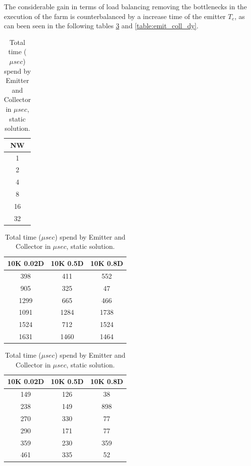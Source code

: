 The considerable gain in terms of load balancing removing the bottlenecks in the execution of the farm is counterbalanced by a increase time of the emitter $T_e$, as can been seen in the following tables \ref{table:emit_coll} and \ref{table:emit_coll_dy}.

\begin{table}[!htb]
\centering
\begin{minipage}{0.08\textwidth}
\centering
\begin{tabular}{|c|}
\hline
NW \\ \hline
1          \\ \hline
2      \\ \hline
4           \\ \hline
8            \\ \hline
16       \\ \hline
32          \\ \hline
\end{tabular}
\end{minipage}
\begin{minipage}{0.43\textwidth}
\centering
\begin{tabular}{|c|c|c|}
\hline
 10K 0.02D & 10K 0.5D & 10K 0.8D \\ \hline
 398       & 411      & 552      \\ \hline
905       & 325      & 47       \\ \hline
 1299      & 665      & 466      \\ \hline
1091      & 1284     & 1738     \\ \hline
1524      & 712      & 1524     \\ \hline
1631      & 1460     & 1464     \\ \hline
\end{tabular}

\end{minipage}
\begin{minipage}{0.43\textwidth}
\centering
\begin{tabular}{|c|c|c|}
\hline
 10K 0.02D & 10K 0.5D & 10K 0.8D \\ \hline
149       & 126      & 38       \\ \hline
238       & 149      & 898      \\ \hline
270       & 330      & 77       \\ \hline
290       & 171      & 77       \\ \hline
359       & 230      & 359      \\ \hline
461       & 335      & 52       \\ \hline
\end{tabular}
\end{minipage}
\caption{Total time ($\mu sec$) spend by Emitter and Collector in $\mu sec$, static solution.}
\label{table:emit_coll}
\end{table}

